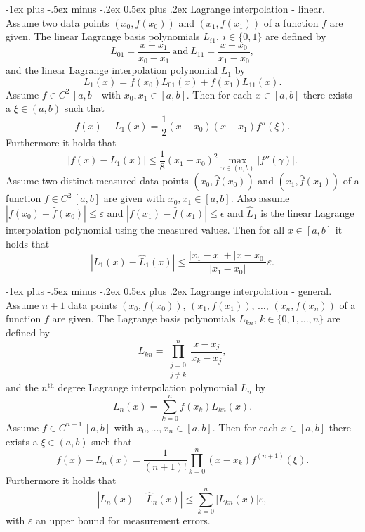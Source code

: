 \documentclass[10pt,landscape,a4paper]{article}
\makeatletter
\renewcommand{\section}{\@startsection{section}{1}{0mm}%
	{-1ex plus -.5ex minus -.2ex}%
	{0.5ex plus .2ex}%
	{\normalfont\large\bfseries}}
\makeatother
\begin{document}
\begin{multicols}{3}
	\section{Lagrange interpolation - linear.}
	Assume two data points $ (x_0,f(x_0)) $ and $ (x_1,f(x_1)) $ of a function $ f $ are given. The linear Lagrange basis polynomials $ L_{i1}, \ i\in\{0,1\} $ are defined by
	\[
		L_{01}=\frac{x-x_1}{x_0-x_1}\ \text{and}\ L_{11}=\frac{x-x_0}{x_1-x_0},
	\]
	and the linear Lagrange interpolation polynomial $ L_1 $ by
	\[
		L_1(x) = f(x_0)L_{01}(x)+f(x_1)L_{11}(x).
	\]
	Assume $ f\in C^2\,[a,b] $ with $ x_0,x_1\in[a,b] $. Then for each $ x\in[a,b] $ there exists a $ \xi\in(a,b) $ such that
	\[
		f(x)-L_1(x)=\frac{1}{2}(x-x_0)(x-x_1)f''(\xi).
	\]
	Furthermore it holds that
	\[
		|f(x)-L_1(x)|\leq\frac{1}{8}(x_1-x_0)^2\underset{\gamma\in(a,b)}{\max}|f''(\gamma)|.
	\]
	Assume two distinct measured data points $ (x_0,\hat{f}(x_0)) $ and $ (x_1,\hat{f}(x_1)) $ of a function $ f\in C^2\,[a,b] $ are given with $ x_0,x_1\in[a,b] $.
	Also assume $ |f(x_0)-\hat{f}(x_0)|\leq\varepsilon $ and $ |f(x_1)-\hat{f}(x_1)|\leq\epsilon $ and $ \hat{L}_1 $ is the linear Lagrange interpolation polynomial using the measured values.
	Then for all $ x\in[a,b] $ it holds that
	\[
		|L_1(x)-\hat{L}_1(x)|\leq\frac{|x_1-x|+|x-x_0|}{|x_1-x_0|}\varepsilon.
	\]
	
	\section{Lagrange interpolation - general.}
	Assume $ n+1 $ data points $ (x_0,f(x_0)) $, $ (x_1,f(x_1)) $, $ \ldots $, $ (x_n,f(x_n)) $ of a function $ f $ are given. The Lagrange basis polynomials $ L_{kn} $, $ k\in \{0,1,\ldots,n\} $ are defined by
	\[
		L_{kn} = \prod_{\substack{j=0\\j\neq k}}^{n} \frac{x-x_j}{x_k-x_j},
	\]
	and the $ n^\text{th} $ degree Lagrange interpolation polynomial $ L_n $ by
	\[
		L_n(x) = \sum_{k=0}^{n}f(x_k)L_{kn}(x).
	\]
	Assume $ f\in C^{n+1}\,[a,b] $ with $ x_0,\hdots,x_n\in[a,b] $.
	Then for each $ x\in[a,b] $ there exists a $ \xi\in(a,b) $ such that
	\[
		f(x)-L_n(x)=\frac{1}{(n+1)!}\prod_{k=0}^{n}(x-x_k)f^{(n+1)}(\xi).
	\]
	Furthermore it holds that
	\[
		|L_n(x)-\hat{L}_n(x)|\leq\sum_{k=0}^{n}|L_{kn}(x)|\varepsilon,
	\]
	with $ \varepsilon $ an upper bound for measurement errors.
	

\end{multicols}
\end{document}

